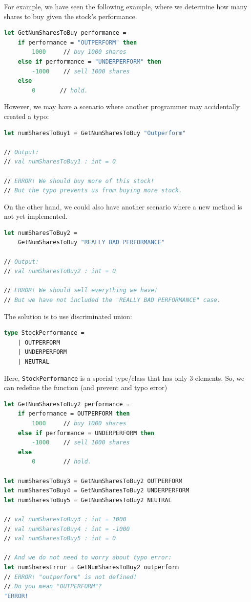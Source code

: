 \documentclass[12pt]{article}
\begin{document}
For example, we have seen the following example, where we determine how many shares to buy given the stock's performance.
\begin{lstlisting}[language=FSharp]
let GetNumSharesToBuy performance =
    if performance = "OUTPERFORM" then
        1000     // buy 1000 shares
    else if performance = "UNDERPERFORM" then
        -1000    // sell 1000 shares
    else 
        0       // hold.
\end{lstlisting}
However, we may have a scenario where another programmer may accidentally created a typo:
\begin{lstlisting}[language=FSharp]
let numSharesToBuy1 = GetNumSharesToBuy "Outperform"

// Output:
// val numSharesToBuy1 : int = 0

// ERROR! We should buy more of this stock! 
// But the typo prevents us from buying more stock.
\end{lstlisting}
On the other hand, we could also have another scenario where a new method is not yet implemented.
\begin{lstlisting}[language=FSharp]
let numSharesToBuy2 = 
    GetNumSharesToBuy "REALLY BAD PERFORMANCE"

// Output:
// val numSharesToBuy2 : int = 0

// ERROR! We should sell everything we have!
// But we have not included the "REALLY BAD PERFORMANCE" case.
\end{lstlisting}
The solution is to use discriminated union:
\begin{lstlisting}[language=FSharp]
type StockPerformance = 
    | OUTPERFORM
    | UNDERPERFORM
    | NEUTRAL
\end{lstlisting}
Here, \texttt{StockPerformance} is a special type/class that has only $3$ elements.
\pagebreak
So, we can redefine the function (and prevent and typo error)
\begin{lstlisting}[language=FSharp]
let GetNumSharesToBuy2 performance =
    if performance = OUTPERFORM then
        1000     // buy 1000 shares
    else if performance = UNDERPERFORM then
        -1000    // sell 1000 shares
    else 
        0        // hold.

let numSharesToBuy3 = GetNumSharesToBuy2 OUTPERFORM
let numSharesToBuy4 = GetNumSharesToBuy2 UNDERPERFORM
let numSharesToBuy5 = GetNumSharesToBuy2 NEUTRAL

// val numSharesToBuy3 : int = 1000
// val numSharesToBuy4 : int = -1000
// val numSharesToBuy5 : int = 0

// And we do not need to worry about typo error:
let numSharesError = GetNumSharesToBuy2 outperform
// ERROR! "outperform" is not defined!
// Do you mean "OUTPERFORM"?
"ERROR!
\end{lstlisting}
\end{document}
